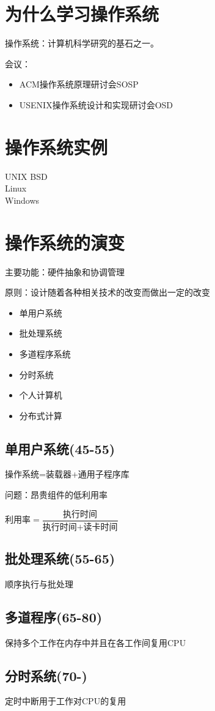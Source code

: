 \section{为什么学习操作系统}
操作系统：计算机科学研究的基石之一。
\par 会议：
\begin{itemize}
	\item ACM操作系统原理研讨会SOSP
	\item USENIX操作系统设计和实现研讨会OSD
\end{itemize}
\section{操作系统实例}
\noindent UNIX BSD\\
Linux\\
Windows
\section{操作系统的演变}
主要功能：硬件抽象和协调管理\par
原则：设计随着各种相关技术的改变而做出一定的改变\\
\begin{itemize}
	\item 单用户系统
	\item 批处理系统
	\item 多道程序系统
	\item 分时系统
	\item 个人计算机
	\item 分布式计算
\end{itemize}
\subsection{单用户系统(45-55)}
操作系统=装载器+通用子程序库\\
\par 问题：昂贵组件的低利用率\par
$\text{利用率}=\dfrac{\text{执行时间}}{\text{执行时间}+\text{读卡时间}}$
\subsection{批处理系统(55-65)}
顺序执行与批处理
\subsection{多道程序(65-80)}
保持多个工作在内存中并且在各工作间复用CPU
\subsection{分时系统(70-)}
定时中断用于工作对CPU的复用
